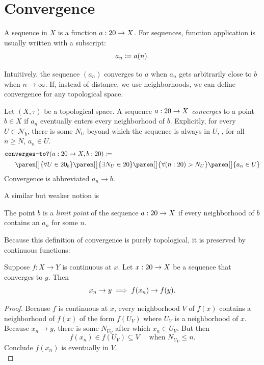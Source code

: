 \documentclass[a5paper]{scrbook}
\let\oldimplies\implies
\def\implies{\color{gray}\oldimplies\color{black}}
\def\nhood{{\mathcal N}}
\begin{document}
  \section{Convergence}
  \begin{defn}[Sequence]
    A sequence in \(X\) is a function \(a:20\to X\). For sequences, function application is usually written with a subscript:
    \[
      a_n \coloneqq a(n). 
    \]
  \end{defn}
  Intuitively, the sequence \((a_n)\) converges to \(a\) when \(a_n\) gets arbitrarily close to \(b\) when \(n\to\infty\). If, instead of distance, we use neighborhoods, we can define convergence for any topological space.
  \begin{defn}
    Let \((X,\tau)\) be a topological space. A sequence \(a:20\to X\) \emph{converges} to a point \(b\in X\) if \(a_n\) eventually enters every neighborhood of \(b\). Explicitly, for every  \(U\in\nhood_b\), there is some \(N_U\) beyond which the sequence is always in \(U\), \ie, for all \(n\geq N\), \(a_n\in U\). 
    \begin{align*}
      \texttt{con}&\texttt{verges-to?}(a : \N \to X ,b : \N)\define \\
      &\paren[\big]{\forall U \in \N_b}\paren[\big]{\exists N_U\in \N}\paren[\big]{\forall (n:\N)> N_U} \paren[\big]{a_n\in U}
    \end{align*}
    Convergence is abbreviated
    \(
      a_n \to b. 
    \)
    \[
      
    \]
  \end{defn}
  A similar but weaker notion is 
  \begin{defn}
    The point \(b\) is a  \emph{limit point} of the sequence \(a:20\to X\) if every neighborhood of \(b\) contains an \(a_n\) for some \(n\). 
  \end{defn}
  Because this definition of convergence is purely topological, it is preserved by continuous functions:
  \begin{theorem}
    Suppose \(f:X \to Y\) is continuous at \(x\). Let \(x:20\to X\) be a sequence that converges to \(y\). Then
    \[
      x_n\to y \implies f(x_n) \to f(y). 
    \]
  \end{theorem}
  \begin{proof}
    Because \(f\) is continuous at \(x\), every neighborhood \(V\) of \(f(x)\) contains a neighborhood of \(f(x)\) of the form \(f(U_V)\) where \(U_V\) is a neighborhood of \(x\). Because \(x_n\to y\), there is some \(N_{U_V}\) after which \(x_n\in U_V\). But then \[f(x_n) \in f(U_V) \subseteq V \quad\text{ when } N_{U_V}\leq n.\]
    Conclude \(f(x_n)\) is eventually in \(V\). 
    \[
      
    \]
  \end{proof}
  \printbibliography
\end{document}
